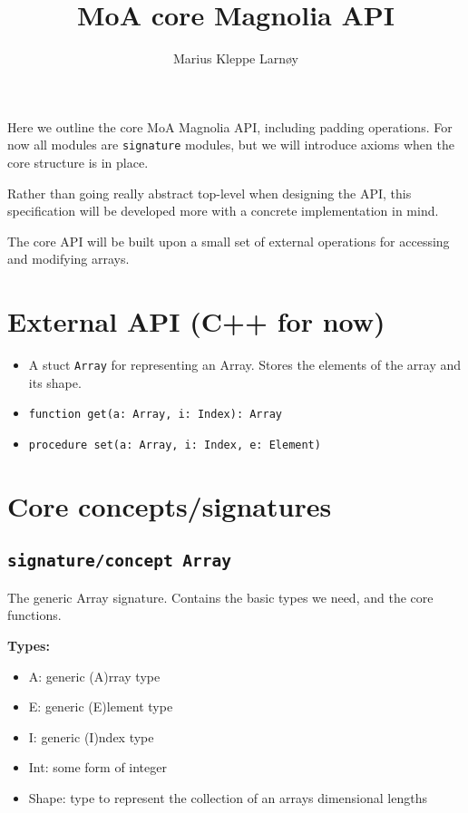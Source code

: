 \documentclass{article}
\author{Marius Kleppe Larnøy}
\begin{document}
\title{MoA core Magnolia API}
\maketitle

\noindent Here we outline the core MoA Magnolia API, including padding operations. For now all modules are \texttt{signature} modules, but we will introduce axioms when the core structure is in place.

\noindent Rather than going really abstract top-level when designing the API, this specification will be developed more with a concrete implementation in mind.

\noindent The core API will be built upon a small set of external operations for accessing and modifying arrays.

\section{External API (C++ for now)}
\begin{itemize}
    \item A stuct \texttt{Array} for representing an Array. Stores the elements of the array and its shape.
    \item \texttt{function get(a: Array, i: Index): Array}
    \item \texttt{procedure set(a: Array, i: Index, e: Element)}
\end{itemize}

\section{Core concepts/signatures}

\subsection{\texttt{signature/concept Array}}
\noindent The generic Array signature. Contains the basic types we need, and the core functions.

\noindent \textbf{Types:}
\begin{itemize}
    \item A: generic (A)rray type
    \item E: generic (E)lement type
    \item I: generic (I)ndex type
    \item Int: some form of integer
    \item Shape: type to represent the collection of an arrays dimensional lengths
\end{itemize}
\end{document}
